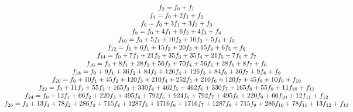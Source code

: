 \documentclass[a4paper,dottedtoc,headinclude,footinclude]{report} %
\theoremstyle{plain}
\begin{document}
    \begin{equation}
        \hspace{-3cm}
        \begin{array}{c}
            f_{2} = f_{0} + f_{1}\\
            f_{4} = f_{0} + 2 f_{1} + f_{2}\\
            f_{6} = f_{0} + 3 f_{1} + 3 f_{2} + f_{3}\\
            f_{8} = f_{0} + 4 f_{1} + 6 f_{2} + 4 f_{3} + f_{4}\\
            f_{10} = f_{0} + 5 f_{1} + 10 f_{2} + 10 f_{3} + 5 f_{4} + f_{5}\\
            f_{12} = f_{0} + 6 f_{1} + 15 f_{2} + 20 f_{3} + 15 f_{4} + 6 f_{5} + f_{6}\\
            f_{14} = f_{0} + 7 f_{1} + 21 f_{2} + 35 f_{3} + 35 f_{4} + 21 f_{5} + 7 f_{6} + f_{7}\\
            f_{16} = f_{0} + 8 f_{1} + 28 f_{2} + 56 f_{3} + 70 f_{4} + 56 f_{5} + 28 f_{6} + 8 f_{7} + f_{8}\\
            f_{18} = f_{0} + 9 f_{1} + 36 f_{2} + 84 f_{3} + 126 f_{4} + 126 f_{5} + 84 f_{6} + 36 f_{7} + 9 f_{8} + f_{9}\\
            f_{20} = f_{0} + 10 f_{1} + 45 f_{2} + 120 f_{3} + 210 f_{4} + 252 f_{5} + 210 f_{6} + 120 f_{7} + 45 f_{8} + 10 f_{9} + f_{10}\\
            f_{22} = f_{0} + 11 f_{1} + 55 f_{2} + 165 f_{3} + 330 f_{4} + 462 f_{5} + 462 f_{6} + 330 f_{7} + 165 f_{8} + 55 f_{9} + 11 f_{10} + f_{11}\\
            f_{24} = f_{0} + 12 f_{1} + 66 f_{2} + 220 f_{3} + 495 f_{4} + 792 f_{5} + 924 f_{6} + 792 f_{7} + 495 f_{8} + 220 f_{9} + 66 f_{10} + 12 f_{11} + f_{12}\\
            f_{26} = f_{0} + 13 f_{1} + 78 f_{2} + 286 f_{3} + 715 f_{4} + 1287 f_{5} + 1716 f_{6} + 1716 f_{7} + 1287 f_{8} + 715 f_{9} + 286 f_{10} + 78 f_{11} + 13 f_{12} + f_{13}\\
        \end{array}
        \label{triangle:fib:first:order:base:instantiation}
    \end{equation}
\end{document}
